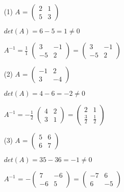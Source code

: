 \documentclass{jsarticle}
\begin{document}
	\begin{description}

		\setlength{\itemsep}{0.5cm}
		\begin{spacing}{1.2}

		\item[(1)]
			$A$ =
			$ \begin{pmatrix}
				2 & 1 \\
				5 & 3
			\end{pmatrix} $

			$ det(A) = 6 - 5 = 1 \neq 0 $

			$ A^{-1} = \frac{1}{1} $
			$ \begin{pmatrix}
				3 & -1 \\
				-5 & 2
			\end{pmatrix} $
			=
			$ \begin{pmatrix}
				3 & -1 \\
				-5 & 2
			\end{pmatrix} $

		\item[(2)]
			$A$ =
			$ \begin{pmatrix}
				-1 & 2 \\
				3 & -4
			\end{pmatrix} $

			$ det(A) = 4 - 6 = -2 \neq 0 $

			$ A^{-1} = -\frac{1}{2} $
			$ \begin{pmatrix}
				4 & 2 \\
				3 & 1
			\end{pmatrix} $
			=
			$ \begin{pmatrix}
				2 & 1 \\
				\frac{3}{2} & \frac{1}{2}
			\end{pmatrix} $

		\item[(3)]
			$A$ =
			$ \begin{pmatrix}
				5 & 6 \\
				6 & 7
			\end{pmatrix} $

			$ det(A) = 35 - 36 = -1 \neq 0 $

			$A^{-1}$ =
			$ -\begin{pmatrix}
				7 & -6 \\
				-6 & 5
			\end{pmatrix} $
			=
			$ \begin{pmatrix}
				-7 & 6 \\
				6 & -5
			\end{pmatrix} $


\end{spacing}
\end{description}
\end{document}
